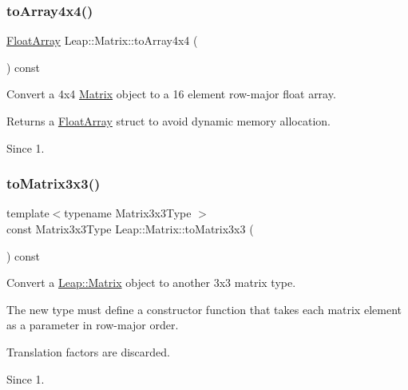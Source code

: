 \subsubsection{\texorpdfstring{to\+Array4x4()}{toArray4x4()}\hspace{0.1cm}{\footnotesize\ttfamily [2/2]}}
{\footnotesize\ttfamily \hyperlink{struct_leap_1_1_float_array}{Float\+Array} Leap\+::\+Matrix\+::to\+Array4x4 (\begin{DoxyParamCaption}{ }\end{DoxyParamCaption}) const\hspace{0.3cm}{\ttfamily [inline]}}

Convert a 4x4 \hyperlink{struct_leap_1_1_matrix}{Matrix} object to a 16 element row-\/major float array.


\begin{DoxyCodeInclude}
\end{DoxyCodeInclude}


Returns a \hyperlink{struct_leap_1_1_float_array}{Float\+Array} struct to avoid dynamic memory allocation. \begin{DoxySince}{Since}
1. 
\end{DoxySince}
\mbox{\label{struct_leap_1_1_matrix_a8cdd078bc3c45361ab0b5fdcea9befd0}} 
\subsubsection{\texorpdfstring{to\+Matrix3x3()}{toMatrix3x3()}}
{\footnotesize\ttfamily template$<$typename Matrix3x3\+Type $>$ \\
const Matrix3x3\+Type Leap\+::\+Matrix\+::to\+Matrix3x3 (\begin{DoxyParamCaption}{ }\end{DoxyParamCaption}) const\hspace{0.3cm}{\ttfamily [inline]}}

Convert a \hyperlink{struct_leap_1_1_matrix}{Leap\+::\+Matrix} object to another 3x3 matrix type.

The new type must define a constructor function that takes each matrix element as a parameter in row-\/major order.

Translation factors are discarded. \begin{DoxySince}{Since}
1. 
\end{DoxySince}
\mbox{\label{struct_leap_1_1_matrix_a6e77d8f3c86df0dd807f4f9f6bf200fe}} 
